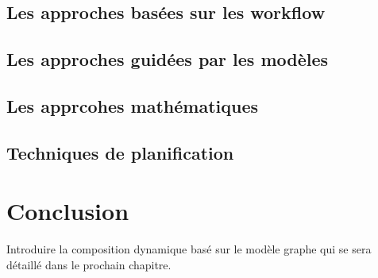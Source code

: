 

    \subsection{Les approches basées sur les workflow}
    \label{sec:les-approches-basees}

    \subsection{Les approches guidées par les modèles}
    \label{sec:les-appr-guid}

    \subsection{Les apprcohes mathématiques}
    \label{sec:les-apprc-math}
   
    \subsection{Techniques de planification}    
    \label{sec:techn-de-plan}

  \section{Conclusion}
  \label{sec:conclusion}
  Introduire la composition dynamique basé sur le modèle graphe qui se
  sera détaillé dans le prochain chapitre.
 


